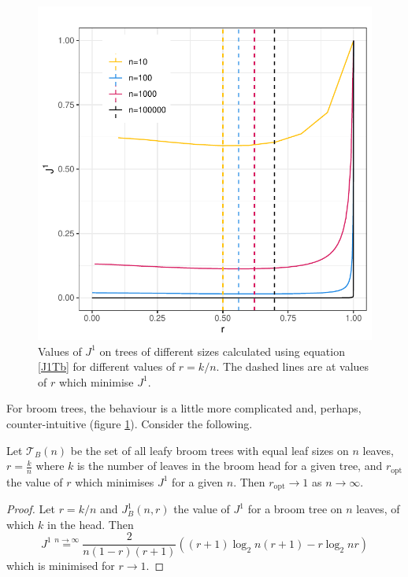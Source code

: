 \begin{figure}[h!]
    \centering
    \includegraphics[width=.7\textwidth]{Chapter_2/figures/j1_lines_plot.pdf}
    \caption{Values of $J^1$ on trees of different sizes calculated using
    equation \eqref{J1Tb} for different values of $r=k/n$. The dashed lines are
    at values of $r$ which minimise $J^1$.}
    \label{j1_lines_plot}
\end{figure}

For broom trees, the behaviour is a little more complicated and, perhaps,
counter-intuitive (figure \ref{j1_lines_plot}). Consider the following.

\begin{proposition}\label{ropt_prop}
    Let $\mathcal{T}_B(n)$ be the set of all leafy broom trees with equal leaf
    sizes on $n$ leaves, $r = \frac{k}{n}$ where $k$ is the number of leaves in
    the broom head for a given tree, and $r_\text{opt}$ the value of $r$ which
    minimises $J^1$ for a given $n$. Then $r_\text{opt}\to 1$ as $n\to\infty$.
\end{proposition}
\begin{proof}
    Let $r = k/n$ and $J^1_B(n,r)$ the value of $J^1$ for a broom tree on $n$
    leaves, of which $k$ in the head. Then
    \begin{equation}
        J^1 \stackrel{n\to\infty}{=} \frac{2}{n(1-r)(r+1)}((r+1)\log_2n(r+1)-
        r\log_2nr)
        \label{broomlim}
    \end{equation}
    which is minimised for $r\to1$.
\end{proof}

